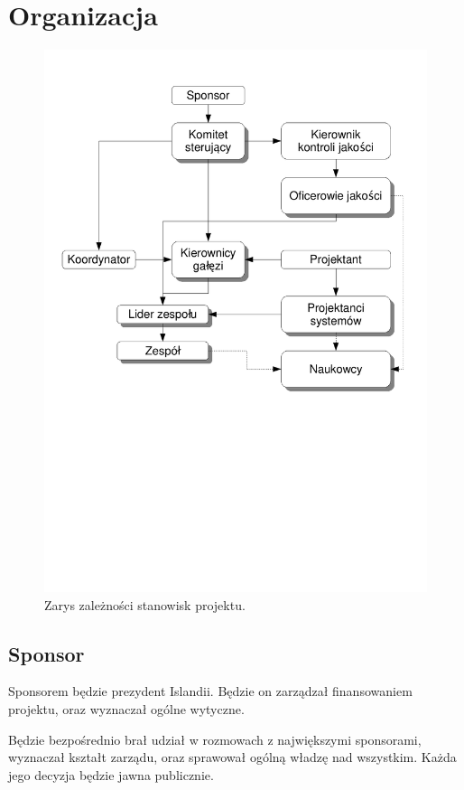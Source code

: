 \section{Organizacja} 
\begin{figure}[H]
\centering
 \includegraphics[width=\textwidth]{img/struktura.pdf}
\caption{Zarys zależności stanowisk projektu.}
\end{figure}
\subsection{Sponsor}
Sponsorem będzie prezydent Islandii.
Będzie on zarządzał finansowaniem projektu, oraz wyznaczał ogólne wytyczne.

Będzie bezpośrednio brał udział w rozmowach z największymi sponsorami, wyznaczał kształt zarządu, oraz sprawował ogólną władzę nad wszystkim.
Każda jego decyzja będzie jawna publicznie.

